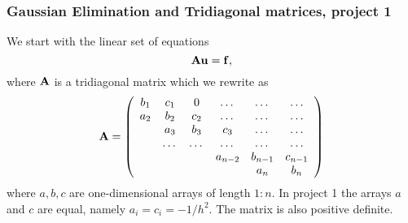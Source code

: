 \documentclass[compress]{beamer}
\begin{document}
\frame
{
  \frametitle{Gaussian Elimination and Tridiagonal matrices, project 1}
\begin{small}
{\scriptsize
We start with the linear set of equations
\[
   {\bf A}{\bf u} = {\bf f},
\]
where ${\bf A}$ is a tridiagonal matrix which we rewrite as
\[
    {\bf A} = \left(\begin{array}{cccccc}
                           b_1& c_1 & 0 &\dots   & \dots &\dots \\
                           a_2 & b_2 & c_2 &\dots &\dots &\dots \\
                           & a_3 & b_3 & c_3 & \dots & \dots \\
                           & \dots   & \dots &\dots   &\dots & \dots \\
                           &   &  &a_{n-2}  &b_{n-1}& c_{n-1} \\
                           &    &  &   &a_n & b_n \\
                      \end{array} \right)
\]
where $a,b,c$ are one-dimensional arrays of length $1:n$.
In project 1 the arrays $a$ and $c$ are equal, namely $a_i=c_i=-1/h^2$.
The matrix is  also positive definite.
}
\end{small}
}
\end{document}
